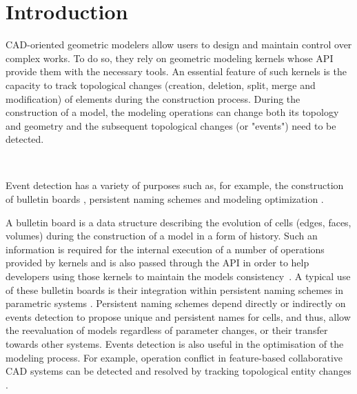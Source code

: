 \section{Introduction}

 CAD-oriented geometric modelers allow users to design and maintain control over complex works.
%
To do so, they rely on geometric modeling kernels \cite{ACIS2023, OCCT2023, Parasolid2023} whose API provide them with the
necessary tools.
%
An essential feature of such kernels is the capacity to track topological changes (creation, deletion, split, merge and modification) of elements during the construction process.
%
During the construction of a model, the modeling operations can change both its topology and geometry and the subsequent topological changes (or "events") need to be detected.

~

Event detection has a variety of purposes such as, for example, the construction of bulletin
boards  \cite{armstrong2000djinn, baba2007generic, OCCT2023}, persistent naming schemes \cite{kripac1995mechanism, Marcheix2002, Bidarra2005, cheon2012name} and modeling optimization \cite{cheng2016meta}.

A bulletin board is a data structure describing the evolution of cells (edges, faces, volumes) during the construction of a model in a form of history.
Such an information is required for the internal execution of a number of operations provided by  kernels and is also passed through the API in order to help developers using those kernels to maintain the models consistency~\cite{armstrong2000djinn, liu2018integrating}.
A typical use of these bulletin boards is their integration within persistent naming schemes in parametric systems \cite{kripac1995mechanism, Marcheix2002, Bidarra2005, Farjana2018}.
Persistent naming schemes depend directly or indirectly on events detection to propose unique and persistent names for cells, and thus, allow the reevaluation of models regardless of parameter changes, or their transfer towards other systems.
Events detection is also useful in the optimisation of
the modeling process. For example, operation conflict in feature-based collaborative CAD systems can be detected and resolved by tracking topological entity changes \cite{cheng2016meta}.

